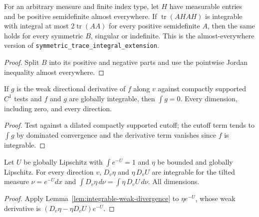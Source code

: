 \begin{lemma}
  \label{lem:symmetric-trace-integral-ae}
  \leanok
  For an arbitrary measure and finite index type, let $H$ have measurable entries and be positive semidefinite almost everywhere. If
  $\operatorname{tr}(AHAH)$ is integrable with integral at most $2\operatorname{tr}(AA)$ for every positive semidefinite $A$, then the same
  holds for every symmetric $B$, singular or indefinite. This is the almost-everywhere version of
  \texttt{symmetric\_trace\_integral\_extension}.
\end{lemma}
\begin{proof}
  \leanok
  Split $B$ into its positive and negative parts and use the pointwise Jordan inequality almost everywhere.
\end{proof}

\begin{lemma}
  \label{lem:integrable-weak-divergence}
  \leanok
  If $g$ is the weak directional derivative of $f$ along $v$ against compactly supported $C^1$ tests and $f$ and $g$ are globally
  integrable, then $\int g=0$. Every dimension, including zero, and every direction.
\end{lemma}
\begin{proof}
  \leanok
  Test against a dilated compactly supported cutoff; the cutoff term tends to $\int g$ by dominated convergence and the derivative term
  vanishes since $f$ is integrable.
\end{proof}

\begin{lemma}
  \label{lem:tilted-ibp-bounded-lipschitz}
  \leanok
  Let $U$ be globally Lipschitz with $\int e^{-U}=1$ and $\eta$ be bounded and globally Lipschitz. For every direction $v$, $D_v\eta$ and
  $\eta\,D_vU$ are integrable for the tilted measure $\nu=e^{-U}dx$ and $\int D_v\eta\,d\nu=\int\eta\,D_vU\,d\nu$. All dimensions.
\end{lemma}
\begin{proof}
  \leanok
  Apply Lemma~\ref{lem:integrable-weak-divergence} to $\eta e^{-U}$, whose weak derivative is $(D_v\eta-\eta D_vU)e^{-U}$.
\end{proof}

